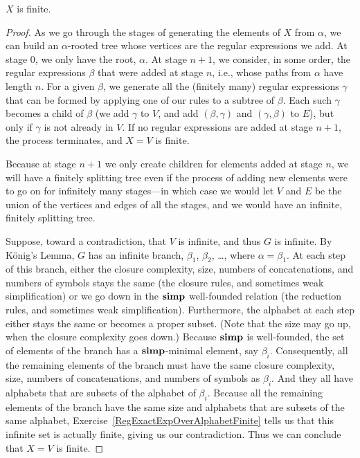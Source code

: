 \begin{lemma}
$X$ is finite.
\end{lemma}

\begin{proof}
As we go through the stages of generating the elements of $X$ from
$\alpha$, we can build an $\alpha$-rooted tree whose vertices are the
regular expressions we add. At stage $0$, we only have the root,
$\alpha$.  At stage $n+1$, we consider, in some order, the regular
expressions $\beta$ that were added at stage $n$, i.e., whose paths
from $\alpha$ have length $n$. For a given $\beta$, we generate all
the (finitely many) regular expressions $\gamma$ that can be formed by
applying one of our rules to a subtree of $\beta$. Each such $\gamma$
becomes a child of $\beta$ (we add $\gamma$ to $V$, and add
$(\beta, \gamma)$ and $(\gamma, \beta)$ to $E$), but only if $\gamma$
is not already in $V$.  If no regular expressions are added at stage
$n+1$, the process terminates, and $X=V$ is finite.

Because at stage $n+1$ we only create children for elements added at
stage $n$, we will have a finitely splitting tree even if the process
of adding new elements were to go on for infinitely many stages---in
which case we would let $V$ and $E$ be the union of the vertices and
edges of all the stages, and we would have an infinite, finitely
splitting tree.

Suppose, toward a contradiction, that $V$ is infinite, and thus $G$ is
infinite. By K\"onig's Lemma, $G$ has an infinite branch, $\beta_1$,
$\beta_2$, \ldots, where $\alpha = \beta_1$. At each step of this
branch, either the closure complexity, size, numbers of
concatenations, and numbers of symbols stays the same (the closure
rules, and sometimes weak simplification) or we go down in the $\mathrel{\mathbf{simp}}$
well-founded relation (the reduction rules, and sometimes weak
simplification). Furthermore, the alphabet at each step either stays
the same or becomes a proper subset. (Note that the size may go up,
when the closure complexity goes down.) Because $\mathrel{\mathbf{simp}}$ is
well-founded, the set of elements of the branch has a $\mathrel{\mathbf{simp}}$-minimal
element, say $\beta_i$. Consequently, all the remaining elements of
the branch must have the same closure complexity, size, numbers of
concatenations, and numbers of symbols as $\beta_i$. And they all have
alphabets that are subsets of the alphabet of $\beta_i$. Because all
the remaining elements of the branch have the same size and alphabets
that are subsets of the same alphabet,
Exercise~\ref{RegExactExpOverAlphabetFinite} tells us that this
infinite set is actually finite, giving us our contradiction.  Thus we
can conclude that $X=V$ is finite.
\end{proof}

